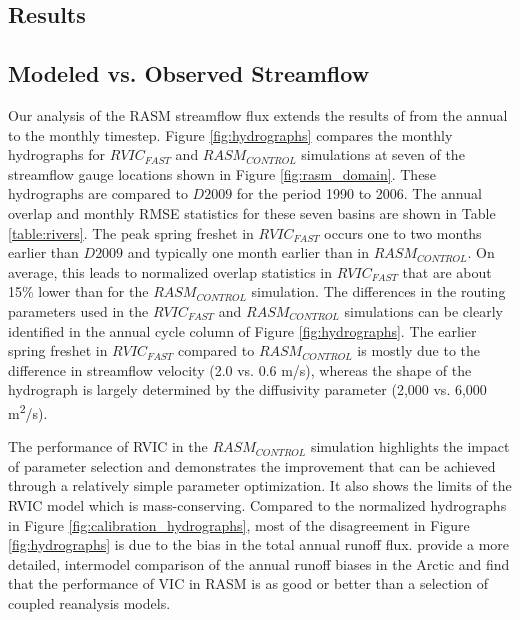 \documentclass[jgrga, draft]{agutex}
\begin{document}
\begin{article}
\section{Results}
\label{sec:results}

\subsection{Modeled vs. Observed Streamflow}
\label{sec:hydrographs}

Our analysis of the RASM streamflow flux extends the results of \citet{Hamman_2016} from the annual to the monthly timestep.
Figure \ref{fig:hydrographs} compares the monthly hydrographs for $RVIC_{FAST}$ and $RASM_{CONTROL}$ simulations at seven of the streamflow gauge locations shown in Figure \ref{fig:rasm_domain}.
These hydrographs are compared to $D2009$ for the period 1990 to 2006.
The annual overlap and monthly RMSE statistics for these seven basins are shown in Table \ref{table:rivers}.
The peak spring freshet in $RVIC_{FAST}$ occurs one to two months earlier than $D2009$ and typically one month earlier than in $RASM_{CONTROL}$.
On average, this leads to normalized overlap statistics in $RVIC_{FAST}$ that are about 15\% lower than for the $RASM_{CONTROL}$ simulation.
The differences in the routing parameters used in the $RVIC_{FAST}$ and $RASM_{CONTROL}$ simulations can be clearly identified in the annual cycle column of Figure \ref{fig:hydrographs}.
The earlier spring freshet in $RVIC_{FAST}$ compared to $RASM_{CONTROL}$ is mostly due to the difference in streamflow velocity (2.0 vs. 0.6 m/s), whereas the shape of the hydrograph is largely determined by the diffusivity parameter (2,000 vs. 6,000 m\textsuperscript{2}/s).

The performance of RVIC in the $RASM_{CONTROL}$ simulation highlights the impact of parameter selection and demonstrates the improvement that can be achieved through a relatively simple parameter optimization.
It also shows the limits of the RVIC model which is mass-conserving.
Compared to the normalized hydrographs in Figure \ref{fig:calibration_hydrographs}, most of the disagreement in Figure \ref{fig:hydrographs} is due to the bias in the total annual runoff flux.
\citet{Hamman_2016} provide a more detailed, intermodel comparison of the annual runoff biases in the Arctic and find that the performance of VIC in RASM is as good or better than a selection of coupled reanalysis models.


\end{article}
\end{document}
